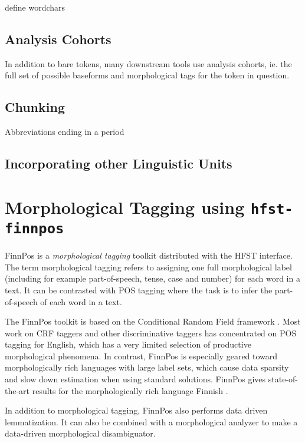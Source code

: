 \documentclass{llncs}
\begin{document}
\begin{framed}
define wordchars 
\end{framed}

\subsection{Analysis Cohorts}

In addition to bare tokens, many downstream tools use analysis cohorts, ie.\@
the full set of possible baseforms and morphological tags for the token in
question.

\subsection{Chunking}

Abbreviations ending in a period

\subsection{Incorporating other Linguistic Units}

\section{Morphological Tagging using {\tt hfst-finnpos}}\label{sec:morph-tagging}

FinnPos \cite{silfverberg2015} is a {\it morphological tagging} toolkit
distributed with the HFST interface. The term morphological tagging
\cite{Chrupala} refers to assigning one full morphological label (including for example part-of-speech, tense, case and number) for
each word in a text. It can be contrasted with POS tagging where the
task is to infer the part-of-speech of each word in a text.

The FinnPos toolkit is based on the Conditional Random Field framework
\cite{lafferty2001}. Most work on CRF taggers and other discriminative
taggers has concentrated on POS tagging for English, which has a very
limited selection of productive morphological phenomena. In contrast,
FinnPos is especially geared toward morphologically rich languages
with large label sets, which cause data sparsity and slow down
estimation when using standard solutions. FinnPos gives state-of-the-art
results for the morphologically rich language Finnish
\cite{silfverberg2015}.

In addition to morphological tagging, FinnPos also performs data
driven lemmatization. It can also be combined with a morphological
analyzer to make a data-driven morphological disambiguator.
\end{document}

